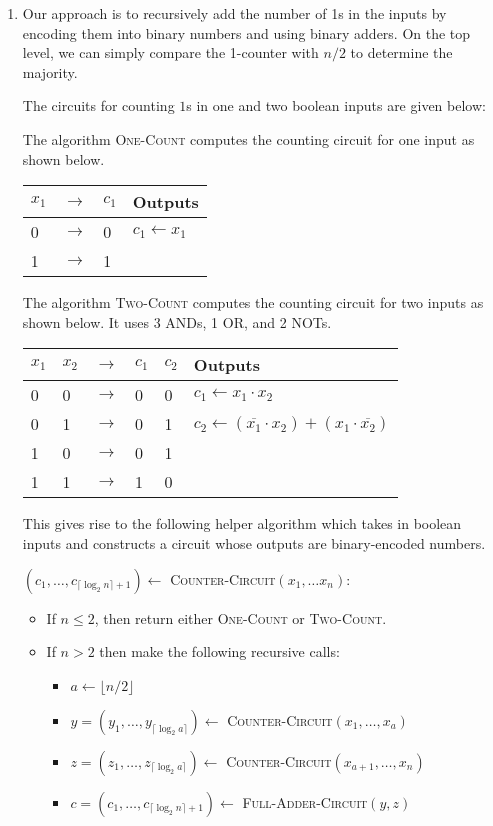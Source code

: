 \documentclass[12pt]{article}
\begin{document}
\begin{enumerate}

\item %
Our approach is to recursively add the number of 1s in the inputs
by encoding them into binary numbers and using binary adders.
On the top level, we can simply compare the 1-counter with $n/2$
to determine the majority.

The circuits for counting $1$s in one and two boolean inputs are given below:

The algorithm \textsc{One-Count} computes the counting circuit for one input
as shown below.\\
\begin{tabular}{|lll|l|}
\hline
$x_1$ & $\rightarrow$ & $c_1$ & Outputs\\
\hline
0 & $\rightarrow$ & 0 & $c_1 \gets x_1$ \\
1 & $\rightarrow$ & 1 &\\
\hline
\end{tabular}

The algorithm \textsc{Two-Count} computes the counting circuit for two inputs
as shown below. It uses 3 ANDs, 1 OR, and 2 NOTs.\\
\begin{tabular}{|lllll|l|}
\hline
$x_1$ & $x_2$ & $\rightarrow$ & $c_1$ & $c_2$ & Outputs\\
\hline
0 & 0 & $\rightarrow$ & 0 & 0 & $c_1 \gets x_1\cdot x_2$ \\
0 & 1 & $\rightarrow$ & 0 & 1 & $c_2 \gets (\overline{x_1} \cdot x_2) + (x_1 \cdot \overline{x_2})$\\
1 & 0 & $\rightarrow$ & 0 & 1 &\\
1 & 1 & $\rightarrow$ & 1 & 0 &\\
\hline
\end{tabular}

This gives rise to the following helper
algorithm which takes in boolean inputs and constructs a
circuit whose outputs are binary-encoded numbers.

$(c_1,\ldots, c_{\lceil\log_2{n}\rceil + 1}) \gets$
\textsc{Counter-Circuit}$(x_1,\ldots x_n)$:
\begin{itemize}
\item If $n \le 2$, then return either \textsc{One-Count} or \textsc{Two-Count}.
\item If $n > 2$ then make the following recursive calls:
\begin{itemize}
\item $a \gets \lfloor n/2 \rfloor$
\item $y = (y_1, \ldots, y_{\lceil\log_2{a}\rceil}) \gets$
\textsc{Counter-Circuit}$(x_1, \ldots, x_a)$
\item $z = (z_1, \ldots, z_{\lceil\log_2{a}\rceil}) \gets$
\textsc{Counter-Circuit}$(x_{a+1}, \ldots, x_n)$
\item $c = (c_1,\ldots,c_{\lceil\log_2{n}\rceil + 1}) \gets$
\textsc{Full-Adder-Circuit}$(y,z)$
\end{itemize}
\end{itemize}


\end{enumerate}
\end{document}
